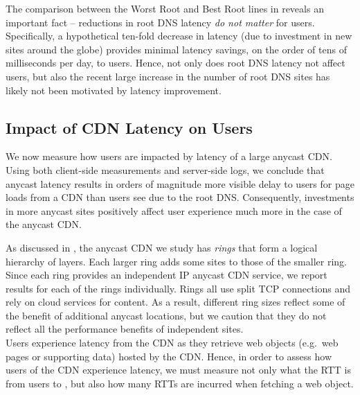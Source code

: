 \documentclass[sigconf,letterpaper,nonacm,10pt,anonymous]{acmart}
\begin{document}
The comparison between the Worst Root and Best Root lines in
 reveals an important fact --
reductions in root DNS latency \emph{do not matter} for users.
Specifically, a hypothetical ten-fold decrease in latency (\ie due to
investment in new sites around the globe) provides minimal latency
savings, on the order of tens of milliseconds per day, to users. Hence,
not only does root DNS latency not affect users, but also the recent
large increase in the number of root DNS sites has likely not been
motivated by latency improvement.

\iffalse
Other things we could discuss here 1. Specifically enumerating the ways
in which the above are over-estimations of daily root DNS latency/root
latency per PLT 2. Where ISI/Columbia fit into daily user latency 3.
U.S. cell providers, and how they lie at the tail end of the curve as
expected \fi

\subsection{Impact of CDN Latency on
Users}\label{impact-of-cdn-latency-on-users}

\label{sec:anycast_cdn_latency}

We now measure how users are impacted by latency of a large anycast CDN.
Using both client-side measurements and server-side logs, we conclude
that anycast latency results in orders of magnitude more visible delay
to users for page loads from a CDN than users see due to the root DNS.
Consequently, investments in more anycast sites positively affect user
experience much more in the case of the anycast CDN.

As discussed in , the anycast CDN we study has
\emph{rings} that form a logical hierarchy of layers. Each larger ring
adds some sites to those of the smaller ring. Since each ring provides
an independent IP anycast CDN service, we report results for each of the
rings individually. Rings all use split TCP connections and rely on
cloud services for content. As a result, different ring sizes reflect
some of the benefit of additional anycast locations, but we caution that
they do not reflect all the performance benefits of independent sites.\\
Users experience latency from the CDN as they retrieve web objects
(e.g.~web pages or supporting data) hosted by the CDN. Hence, in order
to assess how users of the CDN experience latency, we must measure not
only what the RTT is from users to \feplural, but also how many RTTs are
incurred when fetching a web object.
\end{document}
